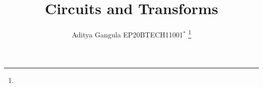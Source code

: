 \documentclass[journal,12pt,twocolumn]{IEEEtran}
\begin{document}
\let\StandardTheFigure\thefigure
\renewcommand{\thefigure}{\theproblem}



\def\putbox#1#2#3{\makebox[0in][l]{\makebox[#1][l]{}\raisebox{\baselineskip}[0in][0in]{\raisebox{#2}[0in][0in]{#3}}}}
     \def\rightbox#1{\makebox[0in][r]{#1}}
     \def\centbox#1{\makebox[0in]{#1}}
     \def\topbox#1{\raisebox{-\baselineskip}[0in][0in]{#1}}
     \def\midbox#1{\raisebox{-0.5\baselineskip}[0in][0in]{#1}}

\vspace{3cm}

\title{ 
Circuits and Transforms
}


%
%
%

\author{Aditya Gangula EP20BTECH11001$^{*}$ %
\thanks{}%
}
% 
%
\end{document}
